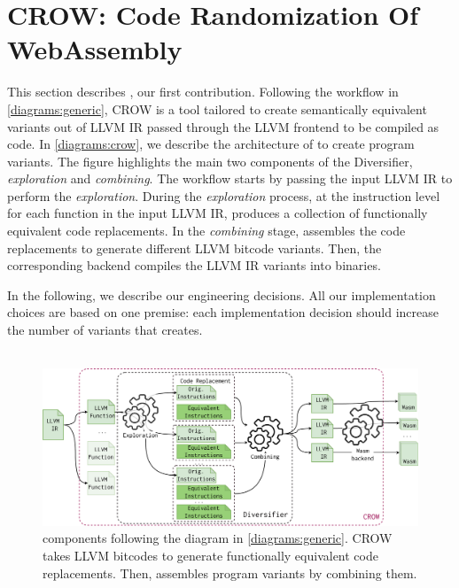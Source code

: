 
\section{CROW: Code Randomization Of WebAssembly}
\label{section:crow}


This section describes \cite{CROW}, our first contribution. Following the workflow in \autoref{diagrams:generic}, CROW is a tool tailored to create semantically equivalent \wasm variants out of LLVM IR passed through the LLVM frontend to be compiled as \wasm code.
In \autoref{diagrams:crow}, we describe the architecture of to create program variants.
The figure highlights the main two components of the Diversifier, \textit{exploration} and \textit{combining}. The workflow starts by passing the input LLVM IR to perform the \emph{exploration}. During the \emph{exploration} process, at the instruction level for each function in the input LLVM IR, produces a collection of functionally equivalent code replacements.  
In the \emph{combining} stage, assembles the code replacements to generate different LLVM bitcode variants. 
Then, the corresponding backend compiles the LLVM IR variants into \wasm binaries.

In the following, we describe our engineering decisions. All our implementation choices are based on one premise: each implementation decision should increase the number of \wasm variants that creates.
\\
\\

\begin{figure}[h]
    \includegraphics[width=\linewidth]{diagrams/generation/crow.drawio.pdf}
    \caption{components following the diagram in \autoref{diagrams:generic}. CROW takes LLVM bitcodes to generate functionally equivalent code replacements. Then, assembles program variants by combining them.}
    \label{diagrams:crow}
\end{figure}


